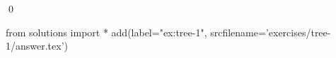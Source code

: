 
\begin{ex} 
  \label{ex:tree-1}
  
  \qed
\end{ex} 
\begin{python0}
from solutions import *
add(label="ex:tree-1",
    srcfilename='exercises/tree-1/answer.tex') 
\end{python0}

